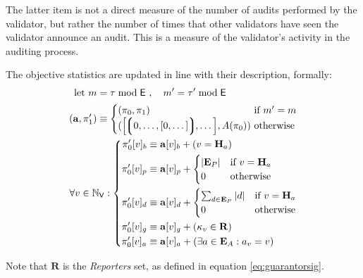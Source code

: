 The latter item is not a direct measure of the number of audits performed by the validator, but rather the number of times that other validators have seen the validator announce an audit. This is a measure of the validator's activity in the auditing process.

The objective statistics are updated in line with their description, formally:
\begin{align}
    \using m =\; &\tau \bmod \mathsf{E} \ ,\quad m' = \tau' \bmod \mathsf{E}\\
    (\mathbf{a}, \pi'_1) \equiv\;&\begin{cases}
        (\pi_0, \pi_1) &\when m' = m \\
        (\sq{\tuple{0, \dots, [0, \dots]}, \dots}, A(\pi_0))\!\!\!\! &\otherwise
    \end{cases}\!\!\!\!\\
    \forall v \in \N_\mathsf{V} :&\; \left\{\begin{aligned}
        \pi'_0[v]_b &\equiv \mathbf{a}[v]_b + (v = \mathbf{H}_a)\\
        \pi'_0[v]_p &\equiv \mathbf{a}[v]_p + \begin{cases}
            |\mathbf{E}_P| &\when v = \mathbf{H}_a \\
            0 &\otherwise
        \end{cases}\\
        \pi'_0[v]_d &\equiv \mathbf{a}[v]_d + \begin{cases}
            \sum_{d \in \mathbf{E}_P}|d| &\when v = \mathbf{H}_a \\
            0 &\otherwise
        \end{cases}\\
        \pi'_0[v]_g &\equiv \mathbf{a}[v]_g + (\kappa_v \in \mathbf{R})\\
        \pi'_0[v]_a &\equiv \mathbf{a}[v]_a + (\exists a \in \mathbf{E}_A : a_v = v)
    \end{aligned}\right.
\end{align}

Note that $\mathbf{R}$ is the \emph{Reporters} set, as defined in equation \ref{eq:guarantorsig}.